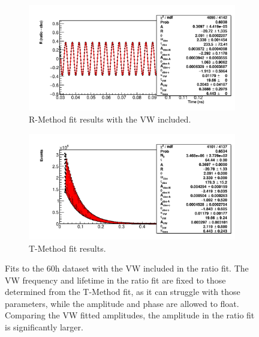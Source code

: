 \documentclass[12pt,letterpaper]{article}
\begin{document}
\begin{figure}[]
\centering
    \begin{subfigure}[]{0.8\textwidth}
        \centering
        \includegraphics[width=\textwidth]{ratioFit_highVWamp}
        \caption{R-Method fit results with the VW included.}
    \label{fig:ratioFit_highVWamp}
    \end{subfigure}%
    \vspace{1cm}
    \begin{subfigure}[]{0.8\textwidth}
        \centering
        \includegraphics[width=\textwidth]{TmethodFit_lowVWamp}
        \caption{T-Method fit results.}
    \label{fig:TmethodFit_lowVWamp}
    \end{subfigure}
\caption[]{Fits to the 60h dataset with the VW included in the ratio fit. The VW frequency and lifetime in the ratio fit are fixed to those determined from the T-Method fit, as it can struggle with those parameters, while the amplitude and phase are allowed to float. Comparing the VW fitted amplitudes, the amplitude in the ratio fit is significantly larger.}
\label{fig:60hfitsVW}
\end{figure}
\end{document}
